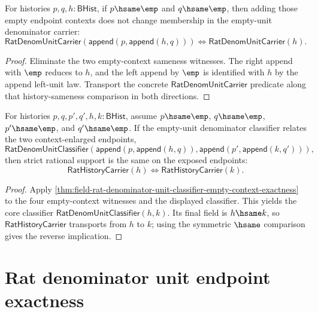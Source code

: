 \begin{theorem}
\label{thm:rat-denom-unit-carrier-empty-context-iff}
For histories $p,q,h:\mathsf{BHist}$, if $p\hsame\emp$ and $q\hsame\emp$,
then adding those empty endpoint contexts does not change membership in the
empty-unit denominator carrier:
$$
\mathsf{RatDenomUnitCarrier}(\mathsf{append}(p,\mathsf{append}(h,q)))
\Longleftrightarrow
\mathsf{RatDenomUnitCarrier}(h).
$$
\end{theorem}
\begin{proof}
Eliminate the two empty-context sameness witnesses. The right append with
$\emp$ reduces to $h$, and the left append by $\emp$ is identified with $h$
by the append left-unit law. Transport the concrete
$\mathsf{RatDenomUnitCarrier}$ predicate along that history-sameness
comparison in both directions.
\end{proof}

\begin{theorem}
\label{thm:rat-denom-unit-classifier-empty-context-rat-carrier-iff}
For histories $p,q,p',q',h,k:\mathsf{BHist}$, assume
$p\hsame\emp$, $q\hsame\emp$, $p'\hsame\emp$, and $q'\hsame\emp$. If the
empty-unit denominator classifier relates the two context-enlarged endpoints,
$$
\mathsf{RatDenomUnitClassifier}
  (\mathsf{append}(p,\mathsf{append}(h,q)),
   \mathsf{append}(p',\mathsf{append}(k,q'))),
$$
then strict rational support is the same on the exposed endpoints:
$$
\mathsf{RatHistoryCarrier}(h)\Longleftrightarrow
\mathsf{RatHistoryCarrier}(k).
$$
\end{theorem}
\begin{proof}
Apply
\autoref{thm:field-rat-denominator-unit-classifier-empty-context-exactness}
to the four empty-context witnesses and the displayed classifier. This yields
the core classifier $\mathsf{RatDenomUnitClassifier}(h,k)$. Its final field is
$h\hsame k$, so $\mathsf{RatHistoryCarrier}$ transports from $h$ to $k$; using
the symmetric $\hsame$ comparison gives the reverse implication.
\end{proof}

\section{Rat denominator unit endpoint exactness}
\label{sec:field-rat-denominator-unit-endpoint-exactness}

